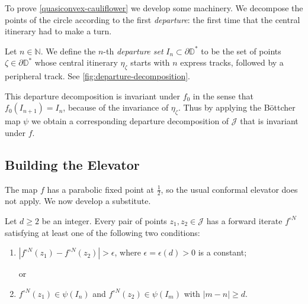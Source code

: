 \begin{comment}
Quantitatively, %
decompose the central itinerary into its constituent tracks $\eta_z = \gamma _1 +\gamma_2 +\ldots,$
then we have the bound $$
and decompose its central itinerary into tracks, 
$$\eta_\zeta = \gamma _1 +\gamma_2 +\ldots.$$
Then
$$\Length(\psi(\gamma_{k}))\lesssim\theta^{-k}$$ uniformly in
$\zeta$, for some constant $\theta=\theta(c)>1$.	
\end{comment}

To prove \cref{quasiconvex-cauliflower} we develop some machinery. We decompose the points of the circle according to 
the first \emph{departure}: the first time that the central itinerary had to make a turn.



\begin{definition}
Let $n \in \mathbb N$. We define the $n$-th \emph{departure set} $I_n \subset \partial \mathbb D ^*$ to be the set of points $\zeta \in \partial \mathbb D^*$ whose central itinerary $\eta_{\zeta}$ starts with $n$ express tracks, followed by a peripheral track.
See \cref{fig:departure-decomposition}.
\end{definition}

This departure decomposition is invariant under $f_0$ in the sense that $f_0(I_{n+1})=I_n$, because of the invariance of $\eta _\zeta$.
Thus by applying the Böttcher map $\psi$ we obtain a corresponding departure decomposition of $\mathcal J$ that is invariant under $f$.

\subsection{Building the Elevator}

The map $f$ has a parabolic fixed point at $\frac 12$, so the usual conformal elevator does not apply. We now develop a substitute.

\begin{theorem} \label{parabolic-elevator}
	Let $d\geq 2$ be an integer. Every pair of points $z_1,z_2 \in \mathcal J$ has a forward iterate $f^{\circ N}$ satisfying at least one of the following two conditions:
	\begin{enumerate}[label=(\roman*)]
		\item $\left|f^{\circ N}(z_1)-f^{\circ N}(z_2)\right|>\epsilon$, where $\epsilon=\epsilon(d)>0$ is a constant;
		
		or
		\item $f^{\circ N }(z_1) \in \psi(I_n)$ and $f^{\circ N }(z_2) \in \psi(I_m)$ with $|m-n| \geq d$.
	\end{enumerate}
\end{theorem}

